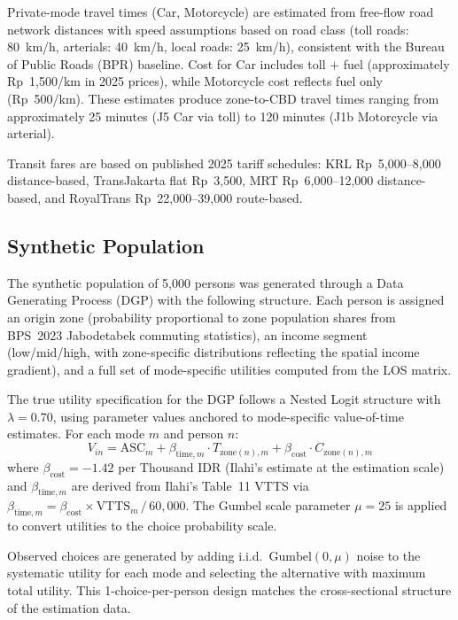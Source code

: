 \documentclass[12pt,a4paper]{article}
\begin{document}
Private-mode travel times (Car, Motorcycle) are estimated from free-flow road network distances with speed assumptions based on road class (toll roads: 80~km/h, arterials: 40~km/h, local roads: 25~km/h), consistent with the Bureau of Public Roads (BPR) baseline. Cost for Car includes toll $+$ fuel (approximately Rp~1,500/km in 2025 prices), while Motorcycle cost reflects fuel only (Rp~500/km). These estimates produce zone-to-CBD travel times ranging from approximately 25 minutes (J5 Car via toll) to 120 minutes (J1b Motorcycle via arterial).

Transit fares are based on published 2025 tariff schedules: KRL Rp~5,000--8,000 distance-based, TransJakarta flat Rp~3,500, MRT Rp~6,000--12,000 distance-based, and RoyalTrans Rp~22,000--39,000 route-based.

\subsection{Synthetic Population}

The synthetic population of 5,000 persons was generated through a Data Generating Process (DGP) with the following structure. Each person is assigned an origin zone (probability proportional to zone population shares from BPS~2023 Jabodetabek commuting statistics), an income segment (low/mid/high, with zone-specific distributions reflecting the spatial income gradient), and a full set of mode-specific utilities computed from the LOS matrix.

The true utility specification for the DGP follows a Nested Logit structure with $\lambda = 0.70$, using parameter values anchored to \citet{ilahi2021} mode-specific value-of-time estimates. For each mode $m$ and person $n$:
\begin{equation}
V_{in} = \text{ASC}_{m} + \beta_{\text{time},m} \cdot T_{\text{zone}(n),m} + \beta_{\text{cost}} \cdot C_{\text{zone}(n),m}
\label{eq:dgputil}
\end{equation}
where $\beta_{\text{cost}} = -1.42$ per Thousand IDR (Ilahi's estimate at the estimation scale) and $\beta_{\text{time},m}$ are derived from Ilahi's Table~11 VTTS via $\beta_{\text{time},m} = \beta_{\text{cost}} \times \text{VTTS}_m \,/\, 60{,}000$. The Gumbel scale parameter $\mu = 25$ is applied to convert utilities to the choice probability scale.

Observed choices are generated by adding i.i.d.\ $\text{Gumbel}(0, \mu)$ noise to the systematic utility for each mode and selecting the alternative with maximum total utility. This 1-choice-per-person design matches the cross-sectional structure of the estimation data.
\end{document}
